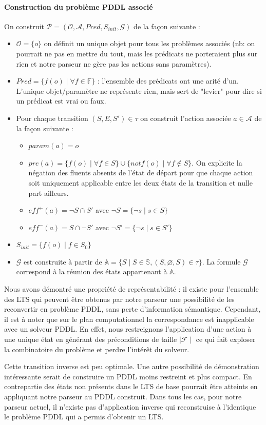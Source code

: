\paragraph{Construction du problème PDDL associé} On construit $\mathcal{P} = (\mathcal{O}, \mathcal{A}, Pred, S_{init}, \mathcal{G})$ de la façon suivante : 
\begin{itemize}
    \item $\mathcal{O} = \{o\}$ on définit un unique objet pour tous les problèmes associés (nb: on pourrait ne pas en mettre du tout, mais les prédicats ne porteraient plus sur rien et notre parseur ne gère pas les actions sans paramètres).  
    \item $Pred = \{f(o) \mid \forall f \in \mathds{F}\}$ : l'ensemble des prédicats ont une arité d'un. L'unique objet/paramètre ne représente rien, mais sert de "levier" pour dire si un prédicat est vrai ou faux.
    \item Pour chaque transition $(S,E,S')\in \tau$ on construit l'action associée $a\in \mathcal{A}$ de la façon suivante :
        \begin{itemize}
            \item $param(a) = o$
            \item $pre(a)= \{f(o) \mid \forall f \in S\} \cup \{not f(o) \mid \forall f \notin S\}$. On explicite la négation des fluents absents de l'état de départ pour que chaque action soit uniquement applicable entre les deux états de la transition et nulle part ailleurs.
            \item $eff^+(a) = \neg S \cap S'$ avec $\neg S = \{\neg s \mid s \in S\}$
            \item $eff^-(a) = S \cap \neg S'$ avec $\neg S' = \{\neg s \mid s \in S'\}$
        \end{itemize}
    \item $S_{init} = \{ f(o) \mid f \in S_0\}$ 
    \item $\mathcal{G}$ est construite  à partir de $\mathds{A} = \{S \mid S \in \mathds{S}, (S,\varnothing, S) \in \tau \}$. La formule $\mathcal{G}$ correspond à la réunion des états appartenant à $\mathds{A}$. 
\end{itemize}


Nous avons démontré une propriété de représentabilité : il existe pour l'ensemble des LTS qui peuvent être obtenus par notre parseur une possibilité de les reconvertir en problème PDDL, sans perte d'information sémantique. Cependant, il est à noter que sur le plan computationnel la correspondance est inapplicable avec un solveur PDDL. En effet, nous restreignons l'application d'une action à une unique état en générant des préconditions de taille $\mid \mathcal{F}\mid$ ce qui fait exploser la combinatoire du problème et perdre l'intérêt du solveur. 

Cette transition inverse est peu optimale. Une autre possibilité de démonstration intéressante serait de construire un PDDL moins restreint et plus compact. En contrepartie des états non présents dans le LTS de base pourrait être atteints en appliquant notre parseur au PDDL construit. Dans tous les cas, pour notre parseur actuel, il n'existe pas d'application inverse qui reconstruise à l'identique le problème PDDL qui a permis d'obtenir un LTS. 

